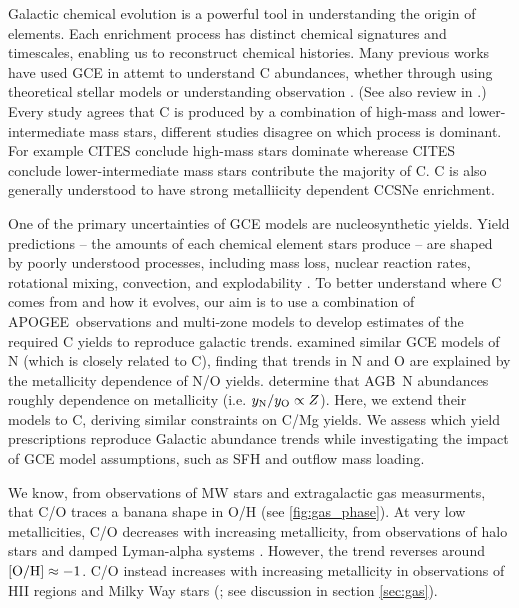 \documentclass[fleqn,usenatbib]{mnras}
\newcommand{\agb}{AGB}
\newcommand{\apogee}{APOGEE}
\newcommand{\gce}{GCE}
\newcommand{\sfh}{SFH}
\newcommand{\lims}{lower-intermediate mass stars}
\newcommand{\hms}{high-mass stars}
\begin{document}


Galactic chemical evolution is a powerful tool in understanding the origin of elements. 
Each enrichment process has distinct chemical signatures and timescales, enabling us to reconstruct chemical histories.
Many previous works have used GCE in attemt to understand C abundances, whether through using theoretical stellar models \citep{DTS78, prantzos+18, chiappini+03} 
or understanding  observation \citep{tinsley79, HEK00, BF06, rybizki+17, berg+19, KKL20}.
(See also review in \citealt{romano22}.)
%
Every study agrees that C is produced by a combination of high-mass and \lims{}, different studies disagree on which process is dominant. 
For example CITES conclude \hms{} dominate wherease CITES conclude \lims{} contribute the majority of C.
C is also generally understood to have strong metalliicity dependent CCSNe enrichment. 


One of the primary uncertainties of GCE models are nucleosynthetic yields. Yield predictions -- the amounts of each chemical element stars produce --
are shaped by poorly understood processes, including mass loss, nuclear reaction rates, rotational mixing, convection, and explodability \citep{romano+10,KL14,ventura+13, LC18, emily+21}.
To better understand where C comes from and how it evolves, our aim is to use a combination of \apogee\ observations and multi-zone models to develop estimates of the required C yields to reproduce galactic trends.
\cite{james+23} examined similar \gce{} models of N (which is closely related to C), finding that trends in N and O\footnotemark{} are explained by the metallicity dependence of N/O yields. \citet{james+23} determine that \agb\ N abundances roughly dependence on metallicity (i.e. $y_{\rm N}/y_{\rm O} \propto Z$). 
Here, we extend their models to C, deriving similar constraints on C/Mg yields. We assess which yield prescriptions reproduce Galactic abundance trends while investigating the impact of \gce{} model assumptions, such as \sfh{} and outflow mass loading.

 
We know, from observations of MW stars and extragalactic gas measurments, that C/O traces a banana shape in O/H (see \ref{fig:gas_phase}). 
At very low metallicities, C/O decreases with increasing metallicity, from observations of halo stars and damped Lyman-alpha systems\footnotemark{} \citep{nissen+14, cooke+17, fabbian+09}. 
%
However, the trend reverses around $[{\rm O/H}]\approx-1$\footnotemark{}. 
C/O instead increases with increasing metallicity in observations of HII regions and Milky Way stars (\citealt{berg+19}; see discussion in section \ref{sec:gas}).
\end{document}
